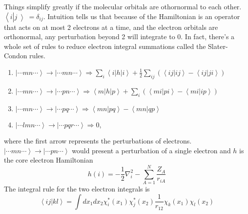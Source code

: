 Things simplify greatly if the molecular orbitals are othornormal to each other. $\left<\right.i\left|\right.j\left>\right. = \delta_{ij}$.
Intuition tells us that because of the Hamiltonian is an operator that acts on at most 2 electrons at a time, and the electron orbitals are orthonormal, any perturbation beyond 2 will integrate to 0.
In fact, there's a whole set of rules to reduce electron integral summations called the Slater-Condon rules.
\begin{enumerate}
\item
  $ \left | \cdots mn \cdots \right > \rightarrow \left | \cdots mn
  \cdots \right > \Rightarrow \sum_i \left< i \right| h \left| i
  \right> + \frac{1}{2} \sum_{ij} \left( \left< ij | ij \right> - \left< ij | ji \right> \right) $
\item
  $ \left | \cdots mn \cdots \right > \rightarrow \left | \cdots pn
  \cdots \right > \Rightarrow \left< m \right| h \left| p \right> +
  \sum_{i} \left( \left<mi | pi \right> - \left<mi | ip \right> \right) $
\item
  $ \left | \cdots mn \cdots \right > \rightarrow \left | \cdots pq
  \cdots \right > \Rightarrow \left< mn | pq \right> - \left< mn | qp \right> $
\item
  $ \left | \cdots lmn \cdots \right > \rightarrow \left | \cdots pqr
  \cdots \right > \Rightarrow 0 $,
\end{enumerate}
where the first arrow represents the perturbations of electrons. \(\left| \cdots mn \cdots \right> \rightarrow \left| \cdots pn \cdots \right>\) would present a perturbation of a single electron and
\(h\) is the core electron Hamiltonian
\begin{equation}\label{eq:CoreElectron}
  h(i) = -\frac{1}{2}\nabla_i^2 - \sum_{A=1}^N \frac{Z_A}{r_{iA}}
\end{equation}
The integral rule for the two electron integrals is
\begin{equation}
  \left< ij | kl \right> = \int dx_1 dx_2 \chi_i^*(x_1) \chi_j^*(x_2) \frac{1}{r_{12}} \chi_k(x_1) \chi_l(x_2)
\end{equation}

